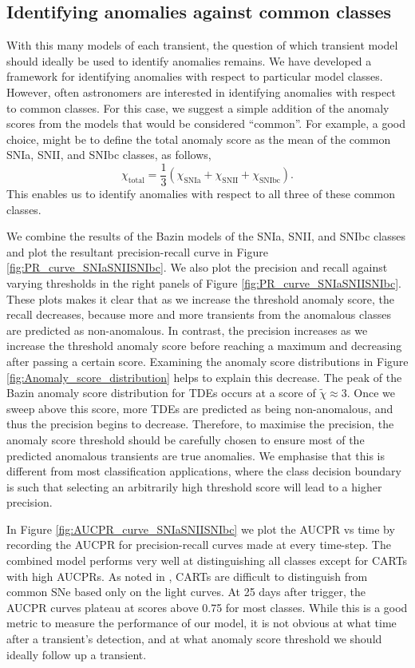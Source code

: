 \documentclass[fleqn,usenatbib]{mnras}
\begin{document}
\subsection{Identifying anomalies against common classes}
With this many models of each transient, the question of which transient model should ideally be used to identify anomalies remains. We have developed a framework for identifying anomalies with respect to particular model classes. However, often astronomers are interested in identifying anomalies with respect to common classes. For this case, we suggest a simple addition of the anomaly scores from the models that would be considered ``common''. For example, a good choice, might be to define the total anomaly score as the mean of the common SNIa, SNII, and SNIbc classes, as follows,
\begin{equation}
    \chi_{\mathrm{total}} = \frac{1}{3} \left( \chi_{\mathrm{SNIa}} + \chi_{\mathrm{SNII}} + \chi_{\mathrm{SNIbc}} \right).
\end{equation}
This enables us to identify anomalies with respect to all three of these common classes. 

We combine the results of the Bazin models of the SNIa, SNII, and SNIbc classes and plot the resultant precision-recall curve in Figure \ref{fig:PR_curve_SNIaSNIISNIbc}. We also plot the precision and recall against varying thresholds in the right panels of Figure \ref{fig:PR_curve_SNIaSNIISNIbc}. These plots makes it clear that as we increase the threshold anomaly score, the recall decreases, because more and more transients from the anomalous classes are predicted as non-anomalous. In contrast, the precision increases as we increase the threshold anomaly score before reaching a maximum and decreasing after passing a certain score. Examining the anomaly score distributions in Figure \ref{fig:Anomaly_score_distribution} helps to explain this decrease. The peak of the Bazin anomaly score distribution for TDEs occurs at a score of $\tilde{\chi} \approx 3$. Once we sweep above this score, more TDEs are predicted as being non-anomalous, and thus the precision begins to decrease. Therefore, to maximise the precision, the anomaly score threshold should be carefully chosen to ensure most of the predicted anomalous transients are true anomalies.  We emphasise that this is different from most classification applications, where the class decision boundary is such that selecting an arbitrarily high threshold score will lead to a higher precision.

In Figure \ref{fig:AUCPR_curve_SNIaSNIISNIbc} we plot the AUCPR vs time by recording the AUCPR for precision-recall curves made at every time-step. The combined model performs very well at distinguishing all classes except for CARTs with high AUCPRs. As noted in \citet{Muthukrishna19RAPID}, CARTs are difficult to distinguish from common SNe based only on the light curves. At 25 days after trigger, the AUCPR curves plateau at scores above 0.75 for most classes. While this is a good metric to measure the performance of our model, it is not obvious at what time after a transient's detection, and at what anomaly score threshold we should ideally follow up a transient.
\end{document}
